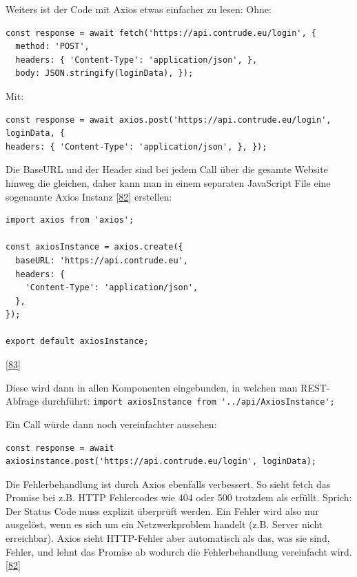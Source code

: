 \documentclass[
    headings=optiontotocandhead,%
    twoside,
    numbers=noenddot,%
    12pt, %
    titlepage, %
    parskip=full, %
    listof=leveldown, 
    numbers=noenddot, %
    a4paper,DIV=14,
    BCOR=15mm,
]{scrbook}
\newcommand{\passthrough}[1]{#1}
\begin{document}
Weiters ist der Code mit Axios etwas einfacher zu lesen: Ohne:

\begin{lstlisting}[caption={Beispiel REST Call mit fetch-api}]
const response = await fetch('https://api.contrude.eu/login', { 
  method: 'POST', 
  headers: { 'Content-Type': 'application/json', }, 
  body: JSON.stringify(loginData), });
\end{lstlisting}

Mit:

\begin{lstlisting}[caption={Beispiel REST Call mit Axios}]
const response = await axios.post('https://api.contrude.eu/login', loginData, { 
headers: { 'Content-Type': 'application/json', }, });
\end{lstlisting}

Die BaseURL und der Header sind bei jedem Call über die gesamte Website
hinweg die gleichen, daher kann man in einem separaten JavaScript File
eine sogenannte Axios Instanz
{[}\protect\hyperlink{ref-gpt-AxiosVT}{82}{]} erstellen:

\begin{lstlisting}[caption={Axios Instanz}]
import axios from 'axios';

const axiosInstance = axios.create({
  baseURL: 'https://api.contrude.eu',
  headers: {
    'Content-Type': 'application/json',
  },
});

export default axiosInstance;
\end{lstlisting}

{[}\protect\hyperlink{ref-Axios-Docs-Instance}{83}{]}

Diese wird dann in allen Komponenten eingebunden, in welchen man
REST-Abfrage durchführt:
\passthrough{\lstinline!import axiosInstance from '../api/AxiosInstance';!}

Ein Call würde dann noch vereinfachter aussehen:

\begin{lstlisting}[caption={Beispiel REST Call mit Axios + Instanz}]
const response = await axiosinstance.post('https://api.contrude.eu/login', loginData);
\end{lstlisting}

Die Fehlerbehandlung ist durch Axios ebenfalls verbessert. So sieht
fetch das Promise bei z.B. HTTP Fehlercodes wie 404 oder 500 trotzdem
als erfüllt. Sprich: Der Status Code muss explizit überprüft werden. Ein
Fehler wird also nur ausgelöst, wenn es sich um ein Netzwerkproblem
handelt (z.B. Server nicht erreichbar). Axios sieht HTTP-Fehler aber
automatisch als das, was sie sind, Fehler, und lehnt das Promise ab
wodurch die Fehlerbehandlung vereinfacht wird.
{[}\protect\hyperlink{ref-gpt-AxiosVT}{82}{]}
\end{document}
